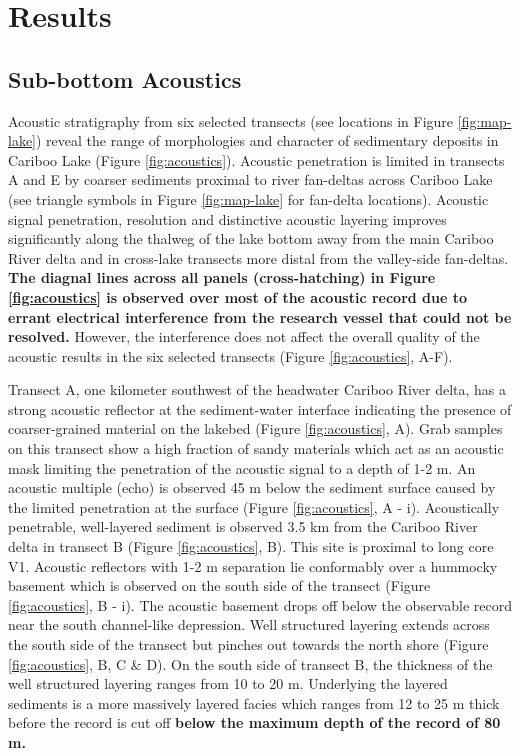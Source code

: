 \documentclass[Royal,times,doublespace,sageh]{sagej}
\begin{document}
\hypertarget{results}{%
\section{Results}\label{results}}

\hypertarget{sub-bottom-acoustics}{%
\subsection{Sub-bottom Acoustics}\label{sub-bottom-acoustics}}

Acoustic stratigraphy from six selected transects (see locations in
Figure \ref{fig:map-lake}) reveal the range of morphologies and
character of sedimentary deposits in Cariboo Lake (Figure
\ref{fig:acoustics}). Acoustic penetration is limited in transects A and
E by coarser sediments proximal to river fan-deltas across Cariboo Lake
(see triangle symbols in Figure \ref{fig:map-lake} for fan-delta
locations). Acoustic signal penetration, resolution and distinctive
acoustic layering improves significantly along the thalweg of the lake
bottom away from the main Cariboo River delta and in cross-lake
transects more distal from the valley-side fan-deltas. \textbf{The
diagnal lines across all panels (cross-hatching) in Figure
\ref{fig:acoustics} is observed over most of the acoustic record due to
errant electrical interference from the research vessel that could not
be resolved.} However, the interference does not affect the overall
quality of the acoustic results in the six selected transects (Figure
\ref{fig:acoustics}, A-F).

Transect A, one kilometer southwest of the headwater Cariboo River
delta, has a strong acoustic reflector at the sediment-water interface
indicating the presence of coarser-grained material on the lakebed
(Figure \ref{fig:acoustics}, A). Grab samples on this transect show a
high fraction of sandy materials which act as an acoustic mask limiting
the penetration of the acoustic signal to a depth of 1-2 m. An acoustic
multiple (echo) is observed 45 m below the sediment surface caused by
the limited penetration at the surface (Figure \ref{fig:acoustics}, A -
i). Acoustically penetrable, well-layered sediment is observed 3.5 km
from the Cariboo River delta in transect B (Figure \ref{fig:acoustics},
B). This site is proximal to long core V1. Acoustic reflectors with 1-2
m separation lie conformably over a hummocky basement which is observed
on the south side of the transect (Figure \ref{fig:acoustics}, B - i).
The acoustic basement drops off below the observable record near the
south channel-like depression. Well structured layering extends across
the south side of the transect but pinches out towards the north shore
(Figure \ref{fig:acoustics}, B, C \& D). On the south side of transect
B, the thickness of the well structured layering ranges from 10 to 20 m.
Underlying the layered sediments is a more massively layered facies
which ranges from 12 to 25 m thick before the record is cut off
\textbf{below the maximum depth of the record of 80 m.}
\end{document}
